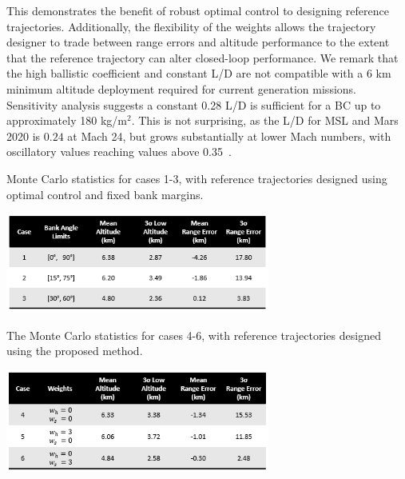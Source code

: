 \documentclass[journal ]{new-aiaa}
\begin{document}
This demonstrates the benefit of robust optimal control to designing reference trajectories. Additionally, the flexibility of the weights allows the trajectory designer to trade between range errors and altitude performance to the extent that the reference trajectory can alter closed-loop performance. We remark that the high ballistic coefficient and constant L/D are not compatible with a 6 km minimum altitude deployment required for current generation missions. Sensitivity analysis suggests a constant 0.28 L/D is sufficient for a BC up to approximately 180 kg/$\mathrm{m}^2 $. This is not surprising, as the L/D for MSL and Mars 2020 is $0.24$ at Mach 24, but grows substantially at lower Mach numbers, with oscillatory values reaching values above 0.35~\cite{MSL_EDL2}. 
\begin{table}[h!]
	\centering
	\caption{Monte Carlo statistics for cases 1-3, with reference trajectories designed using optimal control and fixed bank margins.}
	\includegraphics[width=0.65\textwidth]{ddp/table_deterministic}
	\label{table_deterministic}
\end{table}
\begin{table}[h!]
	\centering
	\caption{The Monte Carlo statistics for cases 4-6, with reference trajectories designed using the proposed method.}
	\includegraphics[width=0.65\textwidth]{ddp/table_robust} %
	\label{table_robust}
\end{table}
\end{document}
